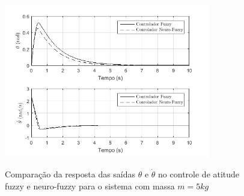 \begin{figure}[!htb]
    \centering
    \caption{Comparação da resposta das saídas $\theta$ e $\dot{\theta}$ no controle de atitude fuzzy e neuro-fuzzy para o sistema com massa $m=5kg$}
    \includegraphics[width=0.8\textwidth]{./04-figuras/resultados/novos/atitude_theta_thetadot_5kg_10s}
    \label{fig:atitude_theta_thetadot_5kg_10s}
\end{figure}




